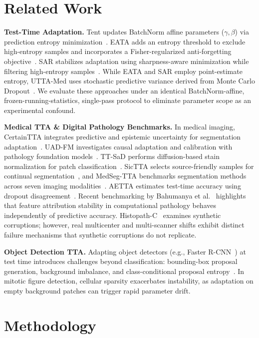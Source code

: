 \documentclass[conference]{IEEEtran}
\begin{document}
\section{Related Work}
\textbf{Test-Time Adaptation.}
Tent updates BatchNorm affine parameters ($\gamma, \beta$) via prediction entropy minimization~\cite{wang2021tent}.
EATA adds an entropy threshold to exclude high-entropy samples and incorporates a Fisher-regularized anti-forgetting objective~\cite{niu2022eata}.
SAR stabilizes adaptation using sharpness-aware minimization while filtering high-entropy samples~\cite{niu2023sar}.
While EATA and SAR employ point-estimate entropy, UTTA-Med uses stochastic predictive variance derived from Monte Carlo Dropout~\cite{gal2016dropout}.
We evaluate these approaches under an identical BatchNorm-affine, frozen-running-statistics, single-pass protocol to eliminate parameter scope as an experimental confound.

\textbf{Medical TTA \& Digital Pathology Benchmarks.}
In medical imaging, CertainTTA integrates predictive and epistemic uncertainty for segmentation adaptation~\cite{certaintta2025}.
UAD-FM investigates causal adaptation and calibration with pathology foundation models~\cite{uadfm2025}.
TT-SaD performs diffusion-based stain normalization for patch classification~\cite{ttsad2024}.
SicTTA selects source-friendly samples for continual segmentation~\cite{sictta2026}, and MedSeg-TTA benchmarks segmentation methods across seven imaging modalities~\cite{yu2025medsegtta}.
AETTA estimates test-time accuracy using dropout disagreement~\cite{lee2024aetta}.
Recent benchmarking by Bahumanya et al.~\cite{bahumanya2026explanationstability} highlights that feature attribution stability in computational pathology behaves independently of predictive accuracy.
Histopath-C~\cite{histopathc2026} examines synthetic corruptions; however, real multicenter and multi-scanner shifts exhibit distinct failure mechanisms that synthetic corruptions do not replicate.

\textbf{Object Detection TTA.}
Adapting object detectors (e.g., Faster R-CNN~\cite{ren2015fasterrcnn}) at test time introduces challenges beyond classification: bounding-box proposal generation, background imbalance, and class-conditional proposal entropy~\cite{liang2023comprehensive}.
In mitotic figure detection, cellular sparsity exacerbates instability, as adaptation on empty background patches can trigger rapid parameter drift.

\section{Methodology}
\end{document}
